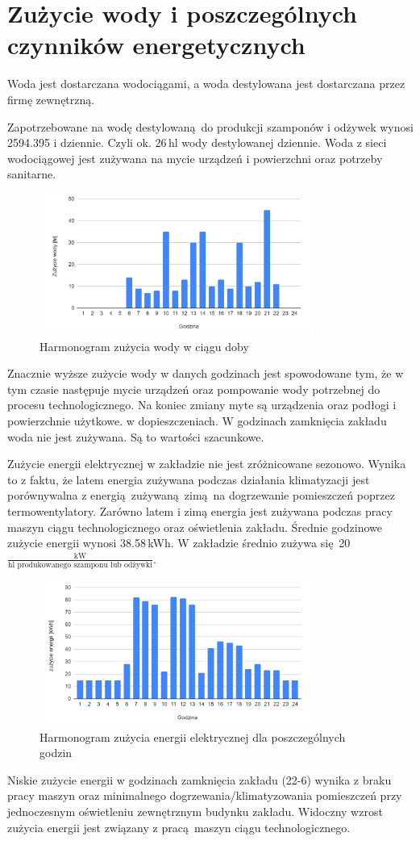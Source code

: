\section{Zużycie wody i poszczególnych czynników energetycznych}

Woda jest dostarczana wodociągami, a woda destylowana jest dostarczana przez firmę zewnętrzną.

Zapotrzebowane na wodę destylowaną do produkcji szamponów i odżywek wynosi 2594.395 i dziennie. Czyli ok. 26\,hl wody destylowanej dziennie. Woda z sieci wodociągowej jest zużywana na mycie urządzeń i powierzchni oraz potrzeby sanitarne.

\begin{figure}[h]
	\centering
	\includegraphics[width=0.8\textwidth]{./sec16/wykres1.png}
	\caption{Harmonogram zużycia wody w ciągu doby}
\end{figure}

Znacznie wyższe zużycie wody w danych godzinach jest spowodowane tym, że w tym czasie następuje mycie urządzeń oraz pompowanie wody potrzebnej do procesu technologicznego. Na koniec zmiany myte są urządzenia oraz podłogi i powierzchnie użytkowe. w dopieszczeniach. W godzinach zamknięcia zakładu woda nie jest zużywana. Są to wartości szacunkowe.

Zużycie energii elektrycznej w zakładzie nie jest zróżnicowane sezonowo. Wynika to z faktu, że latem energia zużywana podczas działania klimatyzacji jest porównywalna z energią zużywaną zimą na dogrzewanie pomieszczeń poprzez termowentylatory.  Zarówno latem i zimą energia jest zużywana podczas pracy maszyn ciągu technologicznego oraz oświetlenia zakładu. Średnie godzinowe zużycie energii wynosi 38.58\,kWh. W zakładzie średnio zużywa się 20$\mathrm{\frac{kW}{hl \text{ produkowanego szamponu lub odżywki}}}$.

\begin{figure}[h]
	\centering
	\includegraphics[width=0.8\textwidth]{./sec16/wykres2.png}
	\caption{Harmonogram zużycia energii elektrycznej dla poszczególnych godzin}
\end{figure}

Niskie zużycie energii w godzinach zamknięcia zakładu (22-6) wynika z braku pracy maszyn oraz minimalnego dogrzewania/klimatyzowania pomieszczeń przy jednoczesnym oświetleniu zewnętrznym budynku zakładu. Widoczny wzrost zużycia energii jest związany z pracą maszyn ciągu technologicznego.
